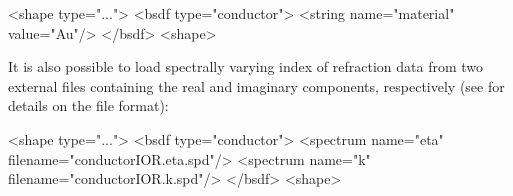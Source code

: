 \begin{xml}[caption=A material configuration for a smooth conductor with
   measured gold data, label=lst:conductor-gold]
<shape type="...">
    <bsdf type="conductor">
        <string name="material" value="Au"/>
    </bsdf>
<shape>
\end{xml}
\vspace{5mm}
It is also possible to load spectrally varying index of refraction data from
two external files containing the real and imaginary components,
respectively (see  for details on the file
format):
\begin{xml}[caption=Rendering a smooth conductor with custom data]
<shape type="...">
    <bsdf type="conductor">
        <spectrum name="eta" filename="conductorIOR.eta.spd"/>
        <spectrum name="k" filename="conductorIOR.k.spd"/>
    </bsdf>
<shape>
\end{xml}
\vspace{1.5cm}
